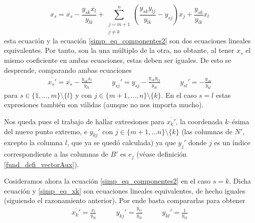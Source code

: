 \begin{equation*}
	x_s=\overline{x_s}-\frac{y_{sk}\overline{x_l}}{y_{lk}}+\sum_{\substack{j=m+1\\j\not=k}}^{n}\left(\frac{y_{sk}y_{lj}}{y_{lk}}-y_{sj}\right)x_j+\frac{y_{sk}}{y_{lk}}x_l
\end{equation*}
esta ecuación y la ecuación \eqref{simp_eq_componentes2} son dos ecuaciones lineales equivalentes. Por tanto, son la una múltiplo de la otra, no obtante, al tener $x_s$ el mismo coeficiente en ambas ecuaciones, estas deben ser iguales. De esto se desprende, comparando ambas ecuaciones
\begin{equation}
	\begin{array}{ccc}
		\displaystyle{\overline{x_s'}=\overline{x_s}-\frac{y_{sk}\overline{x_l}}{y_{lk}}}&\qquad
		\displaystyle{y_{sj}'=y_{sj}-\frac{y_{sk}y_{lj}}{y_{lk}}}&\qquad\displaystyle{y_{sl}'}=-\frac{y_{sk}}{y_{kl}}
	\end{array}
\end{equation}
para $s\in\{1,\dots,m\}\setminus\{l\}$ y con $j\in\{m+1,\dots,n\}\setminus\{k\}$. En el caso $s=l$ estas expresiones también son válidas (aunque no nos importa mucho).

Nos queda pues el trabajo de hallar extresiones para $\overline{x_k'}$, la coordenada $k$--ésima del nuevo punto extremo, e $y_{kj}'$ con $j\in\{m+1,\dots n\}\setminus\{k\}$ (las columnas de $N'$, excepto la columna $l$, que ya se quedó calculada) ya que $y_j'$ donde $j$ es un índice correspondiente a las columnas de $B'$ es $e_j$ (véase definición \ref{fund_defi_vectorAux}).

Cosideramos ahora la ecuación \eqref{simp_eq_componentes2} en el caso $s=k$. Dicha ecuación y \eqref{simp_eq_xk} son ecuaciones lineales equivalentes, de hecho iguales (siguiendo el razonamiento anterior). Por ende basta compararlas para obtener
\begin{equation}
	\begin{array}{ccc}
	\displaystyle{\overline{x_k'}=\frac{\overline{x_l}}{y_{lk}}} \qquad&\displaystyle{ y_{kj}'=\frac{y_{lj}}{y_{lk}}}\qquad&\displaystyle{y_{kl}'=\frac{1}{y_{lk}}}
	\end{array}
\end{equation}
